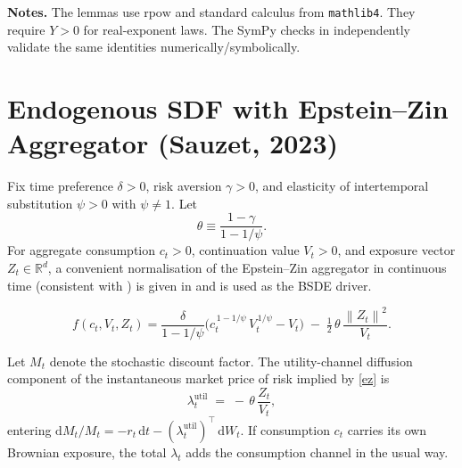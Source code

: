 \documentclass[11pt,letterpaper,oneside]{article}
\numberwithin{equation}{section}
\newcommand{\1}{\mathbf{1}}
\newcommand{\norm}[1]{\left\lVert #1\right\rVert}
\begin{document}
\begin{tcolorbox}[didacticstyle]
\textbf{Notes.} The lemmas use $\mathrm{rpow}$ and standard calculus from \texttt{mathlib4}. They require $Y>0$ for real-exponent laws. The SymPy checks in  independently validate the same identities numerically/symbolically.
\end{tcolorbox}

\section{Endogenous SDF with Epstein--Zin Aggregator (Sauzet, 2023)}\label{sec:ez}

\begin{definition}\label{ez}
Fix time preference $\delta>0$, risk aversion $\gamma>0$, and elasticity of
intertemporal substitution $\psi>0$ with $\psi\neq 1$. Let
\[
\theta \equiv \frac{1-\gamma}{1-1/\psi}.
\]
For aggregate consumption $c_t>0$, continuation value $V_t>0$, and exposure
vector $Z_t\in\mathbb{R}^d$, a convenient normalisation of the Epstein--Zin
aggregator in continuous time (consistent with \cite{Sauzet2023}) is given in
 and is used as the BSDE driver.
\end{definition}

\begin{equation}\label{eq:ez-agg}
f(c_t,V_t,Z_t)
= \frac{\delta}{1-1/\psi}\Big( c_t^{\,1-1/\psi}\,V_t^{\,1/\psi} - V_t \Big)
\; -\; \tfrac{1}{2}\,\theta\,\frac{\norm{Z_t}^2}{V_t}.
\end{equation}

\begin{proposition}\label{sdf-ez}
Let $M_t$ denote the stochastic discount factor. The utility-channel diffusion
component of the instantaneous market price of risk implied by
\cref{ez} is
\[
\lambda^{\mathrm{util}}_t \;=\; -\,\theta\,\frac{Z_t}{V_t},
\]
entering $\mathrm{d}M_t/M_t = -r_t\,\mathrm{d}t - (\lambda^{\mathrm{util}}_t)^{\!\top}\,\mathrm{d}W_t$.
If consumption $c_t$ carries its own Brownian exposure, the total $\lambda_t$ adds
the consumption channel in the usual way.
\end{proposition}
\end{document}
